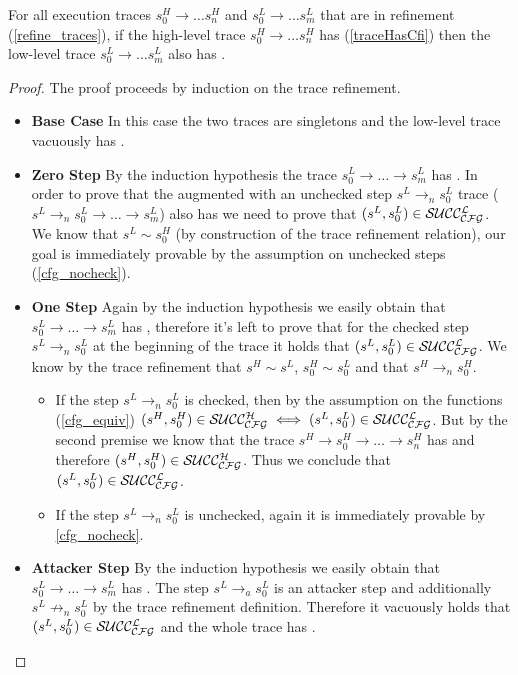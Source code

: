 \begin{theorem}
\label{refine_traces_preserves_trace_has_cfi}
For all execution traces $s^H_0 \to \ldots s^H_n$ and $s^L_0 \to
\ldots s^L_m$ that are in refinement (\cref{refine_traces}), if the
high-level trace $s^H_0 \to \ldots s^H_n$ has \CFI
(\cref{traceHasCfi}) then the low-level trace $s^L_0 \to \ldots s^L_m$
also has \CFI.
\end{theorem}
\begin{proof}
  The proof proceeds by induction on the trace refinement.
  \begin{itemize}
  \item \textbf{Base Case} In this case the two traces are singletons
    and the low-level trace vacuously has \CFI.
  \item \textbf{Zero Step} By the induction hypothesis the trace
    $s^L_0 \to \ldots \to s^L_m$ has \CFI. In order to prove that the
    augmented with an unchecked step $s^L \to_n s^L_0$ trace ($s^L
    \to_n s^L_0 \to \ldots \to s^L_m$) also has \CFI we need to prove that
    $(s^L,s^L_0) \in \mathcal{SUCC_\mathcal{CFG}^{L}}$.  We know that $s^L \sim s^H_0$ (by
    construction of the trace refinement relation), our goal is
    immediately provable by the assumption on unchecked steps
    (\cref{cfg_nocheck}).
  \item \textbf{One Step} Again by the induction hypothesis we easily
    obtain that $s^L_0 \to \ldots \to s^L_m$ has \CFI, therefore it's
    left to prove that for the checked step $s^L \to_n s^L_0$ at the
    beginning of the trace it holds that $(s^L,s^L_0) \in
    \mathcal{SUCC_\mathcal{CFG}^{L}}$. We know by the trace refinement that $s^H \sim s^L$,
    $s^H_0 \sim s^L_0$ and that $s^H \to_n s^H_0$.
    \begin{itemize}
    \item If the step $s^L \to_n s^L_0$ is checked, then by the
      assumption on the \SUCC{} functions (\cref{cfg_equiv})
      $(s^H,s^H_0) \in \mathcal{SUCC_\mathcal{CFG}^{H}} \iff (s^L,s^L_0) \in \mathcal{SUCC_\mathcal{CFG}^{L}}$. But
      by the second premise we know that the trace $s^H \to s^H_0 \to
      \ldots \to s^H_n$ has \CFI and therefore $(s^H,s^H_0) \in
      \mathcal{SUCC_\mathcal{CFG}^{H}}$. Thus we conclude that $(s^L,s^L_0) \in \mathcal{SUCC_\mathcal{CFG}^{L}}$.
    \item If the step $s^L \to_n s^L_0$ is unchecked, again
      it is immediately provable by \cref{cfg_nocheck}.
    \end{itemize}
  \item \textbf{Attacker Step} By the induction hypothesis we easily
    obtain that $s^L_0 \to \ldots \to s^L_m$ has \CFI. The step $s^L
    \to_a s^L_0$ is an attacker step and additionally $s^L \not \to_n
    s^L_0$ by the trace refinement definition. Therefore it vacuously
    holds that $(s^L,s^L_0) \in \mathcal{SUCC_\mathcal{CFG}^{L}}$ and the whole trace has \CFI.
  \end{itemize}
\end{proof}

